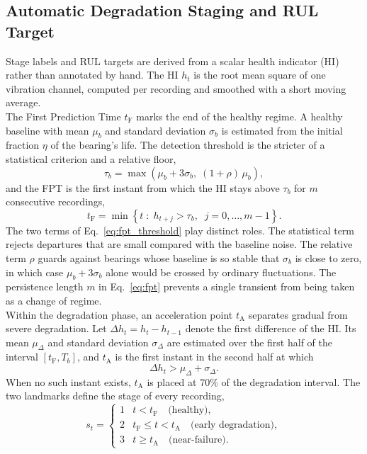 \documentclass[review]{elsarticle}
\begin{document}
\subsection{Automatic Degradation Staging and RUL Target}
\label{sec:method_staging}

Stage labels and RUL targets are derived from a scalar health
indicator (HI) rather than annotated by hand. The HI $h_t$ is the root
mean square of one vibration channel, computed per recording and
smoothed with a short moving average.\\

The First Prediction Time $t_{\mathrm{F}}$ marks the end of the healthy
regime. A healthy baseline with mean $\mu_b$ and standard deviation
$\sigma_b$ is estimated from the initial fraction $\eta$ of the
bearing's life. The detection threshold is the stricter of a
statistical criterion and a relative floor,
\begin{equation}
  \tau_b = \max\left( \mu_b + 3\sigma_b,\; (1+\rho)\,\mu_b \right),
  \label{eq:fpt_threshold}
\end{equation}
and the FPT is the first instant from which the HI stays above
$\tau_b$ for $m$ consecutive recordings,
\begin{equation}
  t_{\mathrm{F}} = \min \left\{ t \;:\; h_{t+j} > \tau_b,
  \;\; j = 0, \dots, m-1 \right\}.
  \label{eq:fpt}
\end{equation}
The two terms of Eq.~\eqref{eq:fpt_threshold} play distinct roles. The
statistical term rejects departures that are small compared with the
baseline noise. The relative term $\rho$ guards against bearings whose
baseline is so stable that $\sigma_b$ is close to zero, in which case
$\mu_b + 3\sigma_b$ alone would be crossed by ordinary fluctuations.
The persistence length $m$ in Eq.~\eqref{eq:fpt} prevents a single
transient from being taken as a change of regime.\\

Within the degradation phase, an acceleration point $t_{\mathrm{A}}$
separates gradual from severe degradation. Let
$\Delta h_t = h_t - h_{t-1}$ denote the first difference of the HI.
Its mean $\mu_\Delta$ and standard deviation $\sigma_\Delta$ are
estimated over the first half of the interval
$[t_{\mathrm{F}}, T_b]$, and $t_{\mathrm{A}}$ is the first instant in
the second half at which
\begin{equation}
  \Delta h_t > \mu_\Delta + \sigma_\Delta .
  \label{eq:acc_point}
\end{equation}
When no such instant exists, $t_{\mathrm{A}}$ is placed at 70\% of the
degradation interval. The two landmarks define the stage of every
recording,
\begin{equation}
  s_t =
  \begin{cases}
    1 & t < t_{\mathrm{F}} \quad \text{(healthy)},\\
    2 & t_{\mathrm{F}} \leq t < t_{\mathrm{A}}
        \quad \text{(early degradation)},\\
    3 & t \geq t_{\mathrm{A}} \quad \text{(near-failure)}.
  \end{cases}
  \label{eq:stages}
\end{equation}
\end{document}
